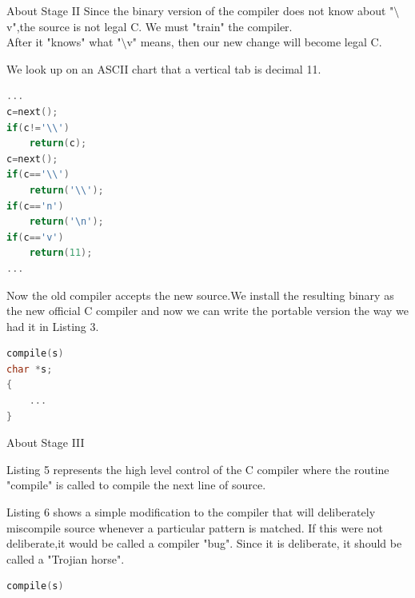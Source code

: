 \documentclass[CJK]{beamer}
\begin{document}
\begin{CJK*}{UTF8}{gbsn}
\begin{frame}{About Stage II}
Since the binary version of the compiler does not know about "$\setminus$v",the source is not legal C. We must "train" the compiler.\\
After it "knows" what "$\setminus$v" means, then our new change will become legal C.
\begin{block}{}
We look up on an ASCII chart that a vertical tab is decimal 11.
\end{block}
\end{frame}
{\tiny
\begin{lstlisting}[language=C,caption=Stage II 2.3,keywordstyle=\color{blue!70}, commentstyle=\color{red!50!green!50!blue!50}, frame=shadowbox, rulesepcolor=\color{red!20!green!20!blue!20}]
...
c=next();
if(c!='\\')
	return(c);
c=next();
if(c=='\\')
	return('\\');
if(c=='n')
	return('\n');
if(c=='v')
	return(11);
...
\end{lstlisting}
}
Now the old compiler accepts the new source.We install the resulting binary as the new official C compiler and now we can write the portable version the way we had it in Listing 3.
{\tiny
\begin{lstlisting}[language=C,caption=Stage III 3.1,keywordstyle=\color{blue!70}, commentstyle=\color{red!50!green!50!blue!50}, frame=shadowbox, rulesepcolor=\color{red!20!green!20!blue!20}]
compile(s)
char *s;
{
	...
}
\end{lstlisting}
}
\begin{frame}{About Stage III}
	\begin{block}{}
	Listing 5 represents the high level control of the C compiler where the routine "compile" is called to compile the next line of source.
	\end{block}
	\begin{block}{}
	Listing 6 shows a simple modification to the compiler that will deliberately miscompile source whenever a particular pattern is matched. If this were not deliberate,it would be called a compiler "bug". Since it is deliberate, it should be called a "Trojian horse".
	\end{block}
\end{frame}
{\tiny
\begin{lstlisting}[language=C,caption=Stage III 3.2,keywordstyle=\color{blue!70}, commentstyle=\color{red!50!green!50!blue!50}, frame=shadowbox, rulesepcolor=\color{red!20!green!20!blue!20}]
compile(s)

\end{lstlisting}}
\end{CJK*}
\end{document}
